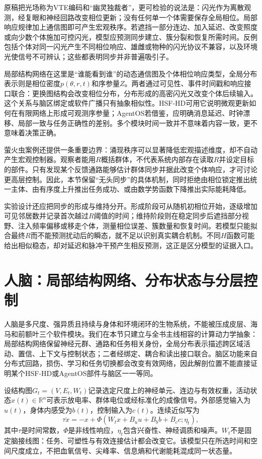 原稿把光场称为VTE编码和“幽灵独裁者”，更可检验的说法是：闪光作为离散观测，经复眼和神经回路改变相位更新；没有任何单一个体需要保存全局相位。局部响应规律加上通信图即可产生宏观秩序。若遮挡一部分连边、加入延迟、改变照度或向少数个体施加可控闪光，模型应预测同步建立、簇分裂和恢复所需时间。反例包括个体对同一闪光产生不同相位响应、雄雌或物种的闪光协议不兼容，以及环境光使信号不可辨认；这些都表明同步并非普遍吸引子。

局部结构网络在这里是“谁能看到谁”的动态通信图及个体相位响应类型，全局分布表示则是相位密度$p(\theta,r,t)$和序参量$Z$。两者通过可见性、事件时间戳和响应接口联合：更换图结构会改变相位分布，分布形成的高密闪光又改变个体后续输入。这个关系与脑区绑定或软件广播只有抽象相似性。HSF-HD可用它说明微观更新如何在有限网络上形成可观测序参量；AgentOS若借鉴，应明确消息延迟、时钟漂移、局部一致与任务正确性的差别。多个模块时间一致并不意味着内容一致，更不意味着决策正确。

萤火虫案例还提供一条重要边界：涌现秩序可以显著降低宏观描述维度，却不自动产生宏观控制器。观察者能用$R$概括群体，不代表系统内部存在读取$R$并设定目标的部件。只有发现某个反馈通路能够估计群体同步并据此改变个体响应，才可讨论更高层控制。因此，本节保留“无头同步”的具体机制，同时拒绝由相位锁定推出统一主体、由有序度上升推出任务成功、或由数学势函数下降推出实际能耗降低。

实验设计还应把同步的形成与维持分开。形成阶段可从随机初相位开始，逐级增加可见邻居数并记录首次越过$R$阈值的时间；维持阶段则在稳定同步后遮挡部分视野、注入频率偏移或移走个体，测量相位误差、簇数量和恢复时间。若模型只能拟合最终$R$而不能预测扰动后的瞬态，就不足以识别真实耦合机制。不同$H$函数可能给出相似稳态，却对延迟和脉冲干预产生相反预测，这正是区分模型的证据入口。

\section{人脑：局部结构网络、分布状态与分层控制}
\label{sec:section_4212}

人脑是多尺度、强异质且持续与身体和环境闭环的生物系统，不能被压成皮层、海马和前额叶三个软件模块。我们在本节只建立与全书主线相容的计算动力学抽象：局部结构网络保留神经元群、通路和任务相关身份，全局分布表示描述跨区域活动、置信、上下文与控制状态；二者经绑定、耦合和读出接口联合。脑区功能来自分布式回路，损伤、学习和任务切换都会改变有效网络，因此解剖位置不能直接证明某个HSF-HD或AgentOS部件与脑区一一等同。

\label{subsec:brain_topological_arch}
设结构图$G_t=(V,E_t,W_t)$记录选定尺度上的神经单元、连边与有效权重，活动状态$x(t)\in\mathbb R^n$可表示放电率、群体电位或经标准化的成像信号。外部感觉输入为$u(t)$，身体内感受为$b(t)$，控制输入为$c(t)$。连续近似写为
\begin{equation}
 \tau\dot x=-x+\Phi(W_t x+B_u u+B_b b+B_c c;\eta_t),
\end{equation}
其中$\tau$是时间常数，$\Phi$是非线性响应，$\eta_t$包含兴奋性、神经调质和噪声。$W_t$不是固定脑接线图：任务、可塑性与有效连接估计都会改变它。该模型只在所选时间和空间尺度成立，不把血氧信号、尖峰率、信息熵和代谢能耗混成同一状态量。

